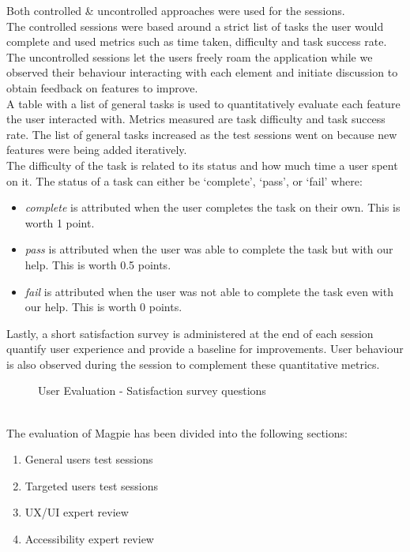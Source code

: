 \noindent Both controlled \& uncontrolled approaches were used for the sessions.\\
The controlled sessions were based around a strict list of tasks the user would complete and used metrics such as time taken, difficulty and task success rate.\\
The uncontrolled sessions let the users freely roam the application while we observed their behaviour interacting with each element and initiate discussion to obtain feedback on features to improve.\\

\noindent A table with a list of general tasks is used to quantitatively evaluate each feature the user interacted with. Metrics measured are task difficulty and task success rate. The list of general tasks increased as the test sessions went on because new features were being added iteratively.\\
The difficulty of the task is related to its status and how much time a user spent on it. The status of a task can either be `complete', `pass', or `fail' where:
\begin{itemize}
    \item \emph{complete} is attributed when the user completes the task on their own. This is worth 1 point.
    \item \emph{pass} is attributed when the user was able to complete the task but with our help. This is worth 0.5 points.
    \item \emph{fail} is attributed when the user was not able to complete the task even with our help. This is worth 0 points.
\end{itemize}
Lastly, a short satisfaction survey is administered at the end of each session quantify user experience and provide a baseline for improvements. User behaviour is also observed during the session to complement these quantitative metrics.\\
\begin{figure}[h!]
    \centering
    \caption{User Evaluation - Satisfaction survey questions}
\end{figure}\\
The evaluation of Magpie has been divided into the following sections:
\begin{enumerate}
    \item General users test sessions
    \item Targeted users test sessions
    \item UX/UI expert review
    \item Accessibility expert review
\end{enumerate}

\newpage
